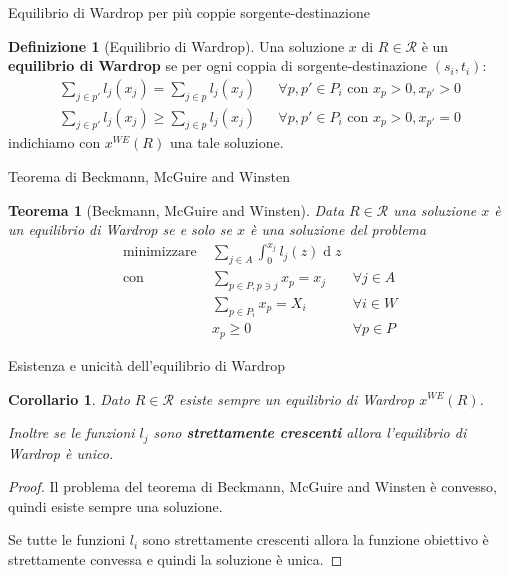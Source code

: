 \documentclass{beamer}
\newcounter{counter1}
\theoremstyle{plain}
\newtheorem{myteo}[counter1]{Teorema}
\newtheorem{mycor}[counter1]{Corollario}
\theoremstyle{definition}
\newtheorem{mydef}[counter1]{Definizione}
\theoremstyle{remark}
\DeclareMathOperator{\de}{d}
\begin{document}
\begin{frame}{Equilibrio di Wardrop per più coppie sorgente-destinazione}
  \begin{mydef}[Equilibrio di Wardrop]
    Una soluzione $x$ di $R\in \mathcal{R}$ è un \textbf{equilibrio di
      Wardrop} se per ogni coppia di sorgente-destinazione
    $(s_i,t_i)$:
    \begin{align*}
      \sum _{j\in p'} l_j(x_j) = \sum _{j\in p} l_j(x_j) & & \forall
                                                             p,p'\in P_i \text{ con } x_p >0, x_{p'} >0 \\
      \sum _{j\in p'} l_j(x_j) \ge \sum _{j\in p} l_j(x_j) & & \forall
                                                               p,p'\in P_i \text{ con } x_p >0, x_{p'} =0 
    \end{align*}
    indichiamo con $x^{WE}(R)$ una tale soluzione.
  \end{mydef}  
\end{frame}

\begin{frame}{Teorema di Beckmann, McGuire and Winsten}
  \begin{myteo}[Beckmann, McGuire and Winsten]
    Data $R\in \mathcal{R}$ una soluzione $x$ è un equilibrio di
    Wardrop se e solo se $x$ è una soluzione del problema
    \begin{align*}
        \text{minimizzare} \;&  \sum _{j\in A} \int _0 ^ {x_j}
        l_j(z)\de z \\
        \text{con} \;& \sum _{p\in P, p\ni j} x_p = x_j&\forall j\in
        A\\
        & \sum _{p\in P_i} x_p = X_i& \forall i\in W\\
        & x_p \ge 0&\forall p\in P        
    \end{align*}
  \end{myteo}
\end{frame}


\begin{frame}{Esistenza e unicità dell'equilibrio di Wardrop}
  \begin{mycor}
    Dato $R\in \mathcal{R}$ esiste sempre un equilibrio di Wardrop
    $x^{WE}(R)$.

    Inoltre se le funzioni $l_j$ sono \textbf{strettamente crescenti}
    allora l'equilibrio di Wardrop è unico.
  \end{mycor}
  \begin{proof}
    Il problema del teorema di Beckmann, McGuire and Winsten è
    convesso, quindi esiste sempre una soluzione.

    Se tutte le funzioni $l_i$ sono strettamente crescenti allora la
    funzione obiettivo è strettamente convessa e quindi la soluzione è
    unica.
  \end{proof}
\end{frame}
\end{document}
